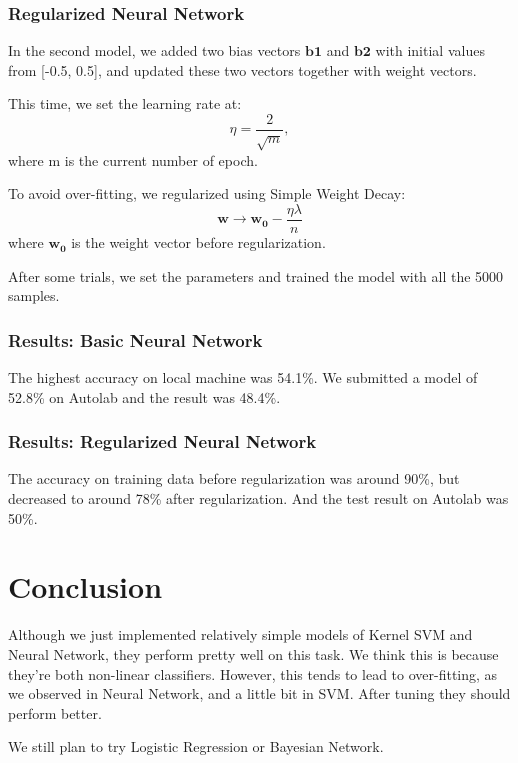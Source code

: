 \documentclass{article} %
\begin{document}
\subsubsection{Regularized Neural Network}
In the second model, we added two bias vectors $\mathbf{b1}$ and  $\mathbf{b2}$ with initial values from [-0.5, 0.5], and updated these two vectors together with weight vectors. 

This time, we set the learning rate at:
\begin{equation}
\eta = \frac{2}{\sqrt{m}},
\end{equation}
where m is the current number of epoch. 

To avoid over-fitting, we regularized using Simple Weight Decay:
\begin{equation}
\mathbf{w}\rightarrow\mathbf{w_0}-\frac{\eta\lambda}{n}
\end{equation}
where $\mathbf{w_0}$ is the weight vector before regularization.

After some trials, we set the parameters and trained the model with all the 5000 samples.

\subsubsection{Results: Basic Neural Network}
The highest accuracy on local machine was 54.1\%. We submitted a model of 52.8\% on Autolab and the result was 48.4\%.
\subsubsection{Results: Regularized Neural Network}
The accuracy on training data before regularization was around 90\%, but decreased to around 78\% after regularization. And the test result on Autolab was 50\%.



\section{Conclusion}
Although we just implemented relatively simple models of Kernel SVM and Neural Network, they perform pretty well on this task. We think this is because they're both non-linear classifiers. However, this tends to lead to over-fitting, as we observed in Neural Network, and a little bit in SVM. After tuning they should perform better.

We still plan to try Logistic Regression or Bayesian Network.




\end{document}

